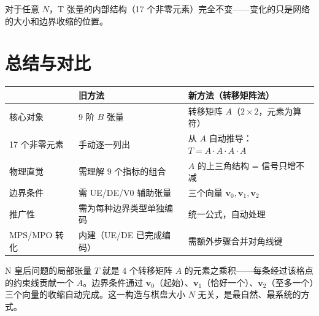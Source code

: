 \documentclass[12pt,a4paper]{article}
\begin{document}
对于任意 $N$，T 张量的内部结构（17 个非零元素）完全不变——变化的只是网络的大小和边界收缩的位置。

\section{总结与对比}

\begin{sumbox}[新旧方法对比总结]
\begin{center}
\renewcommand{\arraystretch}{1.4}
\begin{tabular}{p{3cm}p{4.5cm}p{4.5cm}}
\toprule
& \textbf{旧方法} & \textbf{新方法（转移矩阵法）} \\
\midrule
核心对象 & 9 阶 $B$ 张量 & 转移矩阵 $A$（$2 \times 2$，元素为算符） \\
17 个非零元素 & 手动逐一列出 & 从 $A$ 自动推导：$T = A \cdot A \cdot A \cdot A$ \\
物理直觉 & 需理解 9 个指标的组合 & $A$ 的上三角结构 = 信号只增不减 \\
边界条件 & 需 UE/DE/V0 辅助张量 & 三个向量 $\mathbf{v}_0, \mathbf{v}_1, \mathbf{v}_2$ \\
推广性 & 需为每种边界类型单独编码 & 统一公式，自动处理 \\
MPS/MPO 转化 & 内建（UE/DE 已完成编码） & 需额外步骤合并对角线键 \\
\bottomrule
\end{tabular}
\end{center}
\end{sumbox}

\begin{keybox}[一句话总结]
N 皇后问题的局部张量 $T$ 就是 4 个转移矩阵 $A$ 的元素之乘积——每条经过该格点的约束线贡献一个 $A$。边界条件通过 $\mathbf{v}_0$（起始）、$\mathbf{v}_1$（恰好一个）、$\mathbf{v}_2$（至多一个）三个向量的收缩自动完成。这一构造与棋盘大小 $N$ 无关，是最自然、最系统的方式。
\end{keybox}
\end{document}
